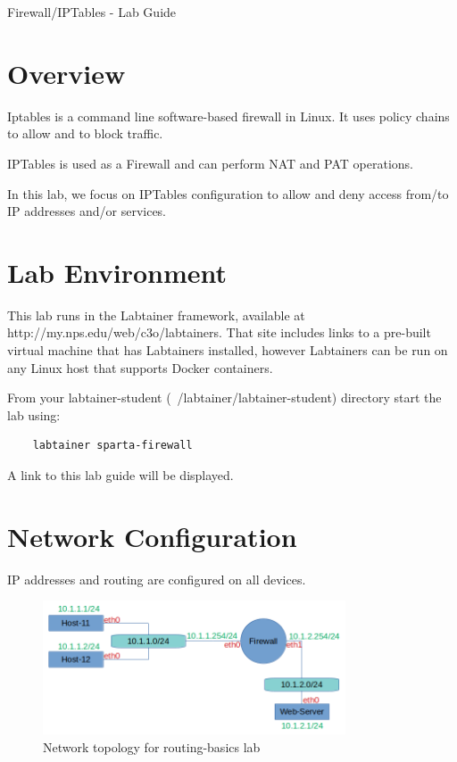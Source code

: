 


\begin{center}
{\LARGE Firewall/IPTables - Lab Guide}
\vspace{0.1in}\\
\end{center}

\copyrightnotice

\section{Overview}
Iptables is a command line software-based firewall in Linux. It uses policy chains to allow and to block traffic.

IPTables is used as a Firewall and can perform NAT and PAT operations.

In this lab, we focus on IPTables configuration to allow and deny access from/to IP addresses and/or services.

\section{Lab Environment}
This lab runs in the Labtainer framework,
available at http://my.nps.edu/web/c3o/labtainers.
That site includes links to a pre-built virtual machine
that has Labtainers installed, however Labtainers can
be run on any Linux host that supports Docker containers.

From your labtainer-student (~/labtainer/labtainer-student) directory start the lab using:
\begin{verbatim}
    labtainer sparta-firewall
\end{verbatim}
\noindent A link to this lab guide will be displayed.

\section{Network Configuration}
IP addresses and routing are configured on all devices.

\begin{figure}[H]
\begin{center}
\includegraphics [width=0.8\textwidth]{labtainers-firewall-lab-01.png}
\end{center}
\caption{Network topology for routing-basics lab}
\label{fig:topology}
\end{figure}

